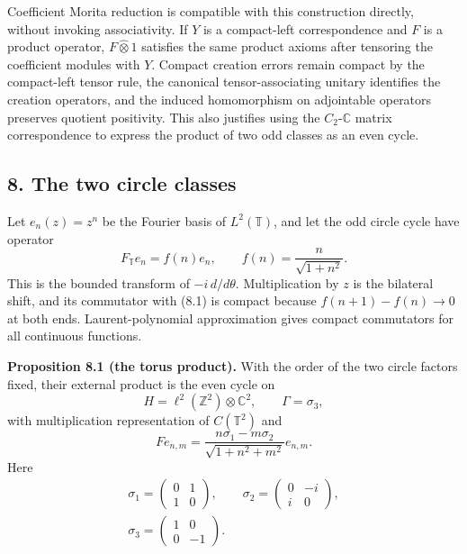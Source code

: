 \documentclass[
  11pt,
]{article}
\begin{document}
Coefficient Morita reduction is compatible with this construction
directly, without invoking associativity. If \(Y\) is a compact-left
correspondence and \(F\) is a product operator, \(F\widehat\otimes1\)
satisfies the same product axioms after tensoring the coefficient
modules with \(Y\). Compact creation errors remain compact by the
compact-left tensor rule, the canonical tensor-associating unitary
identifies the creation operators, and the induced homomorphism on
adjointable operators preserves quotient positivity. This also justifies
using the \(C_2\)-\(\mathbb C\) matrix correspondence to express the
product of two odd classes as an even cycle.

\subsection{8. The two circle classes}\label{the-two-circle-classes}

Let \(e_n(z)=z^n\) be the Fourier basis of \(L^2(\mathbb T)\), and let
the odd circle cycle have operator \[
F_{\mathbb T}e_n=f(n)e_n,\qquad
f(n)=\frac{n}{\sqrt{1+n^2}}.
\tag{8.1}
\] This is the bounded transform of \(-i\,d/d\theta\). Multiplication by
\(z\) is the bilateral shift, and its commutator with (8.1) is compact
because \(f(n+1)-f(n)\to0\) at both ends. Laurent-polynomial
approximation gives compact commutators for all continuous functions.

\textbf{Proposition 8.1 (the torus product).} With the order of the two
circle factors fixed, their external product is the even cycle on \[
H=\ell^2(\mathbb Z^2)\otimes\mathbb C^2,\qquad
\Gamma=\sigma_3,
\] with multiplication representation of \(C(\mathbb T^2)\) and \[
F e_{n,m}
=\frac{n\sigma_1-m\sigma_2}{\sqrt{1+n^2+m^2}}e_{n,m}.
\tag{8.2}
\] Here \[
\begin{gathered}
\sigma_1=\begin{pmatrix}0&1\\1&0\end{pmatrix},\qquad
\sigma_2=\begin{pmatrix}0&-i\\i&0\end{pmatrix},\\
\sigma_3=\begin{pmatrix}1&0\\0&-1\end{pmatrix}.
\end{gathered}
\]
\end{document}
